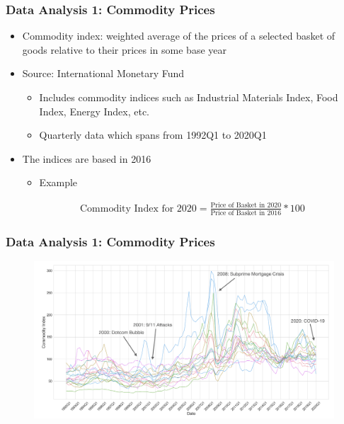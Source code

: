 \documentclass[aspectratio=169]{beamer}
\begin{document}
\begin{frame}
\frametitle{Data Analysis 1: Commodity Prices}
\begin{itemize}
    \item Commodity index: weighted average of the prices of a selected basket of goods relative to their prices in some base year
    \item Source: International Monetary Fund
    \begin{itemize}
        \item Includes commodity indices such as Industrial Materials Index, Food Index, Energy Index, etc.
        \item Quarterly data which spans from 1992Q1 to 2020Q1 %
    \end{itemize}
    \item The indices are based in 2016
        \begin{itemize}
            \item Example  
        \end{itemize}
        \begin{align*}
            \text{Commodity Index for 2020} = \frac{\text{Price of Basket in 2020}}{\text{Price of Basket in 2016}} * 100
        \end{align*}
\end{itemize}
\end{frame}

\begin{frame}
\frametitle{Data Analysis 1: Commodity Prices}
\begin{figure}
    \centering
    \includegraphics[scale=0.4]{comm.png}
\end{figure}
\end{frame}
\end{document}
